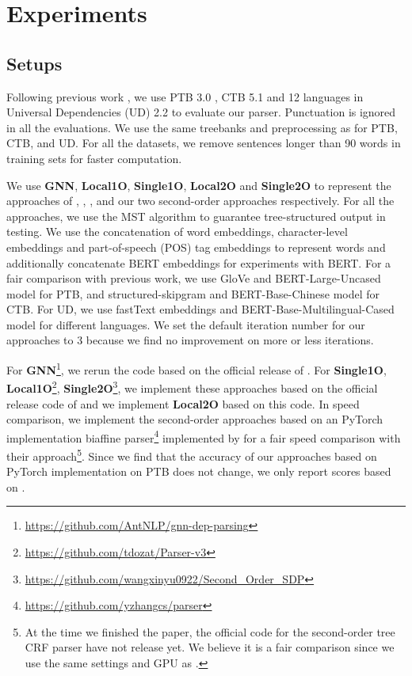 \documentclass[11pt,a4paper]{article}
\begin{document}
\section{Experiments}
\subsection{Setups}
\label{sec:setup}
Following previous work \cite{dozat2016deep,ma-etal-2018-stack}, we use PTB 3.0 \cite{marcus-etal-1993-building}, CTB 5.1 \cite{xue-etal-2002-building} and 12 languages in Universal Dependencies \cite{11234/1-2837} (UD) 2.2 to evaluate our parser. Punctuation is ignored in all the evaluations. We use the same treebanks and preprocessing as \citet{ma-etal-2018-stack} for PTB, CTB, and UD. For all the datasets, we remove sentences longer than 90 words in training sets for faster computation. 

We use \textbf{GNN}, \textbf{Local1O}, \textbf{Single1O}, \textbf{Local2O} and \textbf{Single2O} to represent the approaches of \citet{ji-etal-2019-graph}, \citet{dozat2016deep}, \citet{dozat-manning-2018-simpler}, and our two second-order approaches respectively. For all the approaches, we use the MST algorithm to guarantee tree-structured output in testing. We use the concatenation of word embeddings, character-level embeddings and part-of-speech (POS) tag embeddings to represent words and additionally concatenate BERT embeddings for experiments with BERT. For a fair comparison with previous work, we use GloVe \cite{pennington2014glove} and BERT-Large-Uncased model for PTB, and structured-skipgram \cite{ling-etal-2015-two} and BERT-Base-Chinese model for CTB. For UD, we use fastText embeddings \cite{bojanowski2017enriching} and BERT-Base-Multilingual-Cased model for different languages. We set the default iteration number for our approaches to 3 because we find no improvement on more or less iterations. 

For \textbf{GNN}\footnote{\url{https://github.com/AntNLP/gnn-dep-parsing}}, we rerun the code based on the official release of \citet{ji-etal-2019-graph}. For \textbf{Single1O}, \textbf{Local1O}\footnote{\url{https://github.com/tdozat/Parser-v3}}, \textbf{Single2O}\footnote{\url{https://github.com/wangxinyu0922/Second_Order_SDP}}, we implement these approaches based on the official release code of \citet{wang-etal-2019-second} and we implement \textbf{Local2O} based on this code. In speed comparison, we implement the second-order approaches based on an PyTorch implementation biaffine parser\footnote{\url{https://github.com/yzhangcs/parser}} implemented by \citet{zhang2020efficient} for a fair speed comparison with their approach\footnote{At the time we finished the paper, the official code for the second-order tree CRF parser have not release yet. We believe it is a fair comparison since we use the same settings and GPU as \citet{zhang2020efficient}.}. Since we find that the accuracy of our approaches based on PyTorch implementation on PTB does not change, we only report scores based on \citet{wang-etal-2019-second}.
\end{document}
